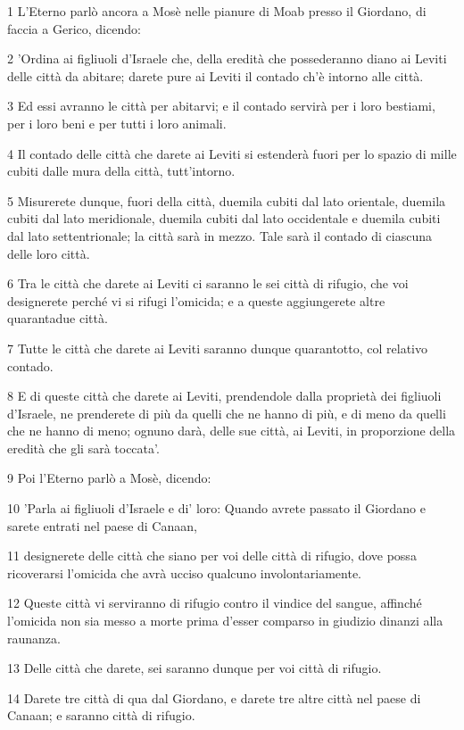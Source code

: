 \par 1 L'Eterno parlò ancora a Mosè nelle pianure di Moab presso il Giordano, di faccia a Gerico, dicendo:
\par 2 'Ordina ai figliuoli d'Israele che, della eredità che possederanno diano ai Leviti delle città da abitare; darete pure ai Leviti il contado ch'è intorno alle città.
\par 3 Ed essi avranno le città per abitarvi; e il contado servirà per i loro bestiami, per i loro beni e per tutti i loro animali.
\par 4 Il contado delle città che darete ai Leviti si estenderà fuori per lo spazio di mille cubiti dalle mura della città, tutt'intorno.
\par 5 Misurerete dunque, fuori della città, duemila cubiti dal lato orientale, duemila cubiti dal lato meridionale, duemila cubiti dal lato occidentale e duemila cubiti dal lato settentrionale; la città sarà in mezzo. Tale sarà il contado di ciascuna delle loro città.
\par 6 Tra le città che darete ai Leviti ci saranno le sei città di rifugio, che voi designerete perché vi si rifugi l'omicida; e a queste aggiungerete altre quarantadue città.
\par 7 Tutte le città che darete ai Leviti saranno dunque quarantotto, col relativo contado.
\par 8 E di queste città che darete ai Leviti, prendendole dalla proprietà dei figliuoli d'Israele, ne prenderete di più da quelli che ne hanno di più, e di meno da quelli che ne hanno di meno; ognuno darà, delle sue città, ai Leviti, in proporzione della eredità che gli sarà toccata'.
\par 9 Poi l'Eterno parlò a Mosè, dicendo:
\par 10 'Parla ai figliuoli d'Israele e di' loro: Quando avrete passato il Giordano e sarete entrati nel paese di Canaan,
\par 11 designerete delle città che siano per voi delle città di rifugio, dove possa ricoverarsi l'omicida che avrà ucciso qualcuno involontariamente.
\par 12 Queste città vi serviranno di rifugio contro il vindice del sangue, affinché l'omicida non sia messo a morte prima d'esser comparso in giudizio dinanzi alla raunanza.
\par 13 Delle città che darete, sei saranno dunque per voi città di rifugio.
\par 14 Darete tre città di qua dal Giordano, e darete tre altre città nel paese di Canaan; e saranno città di rifugio.
